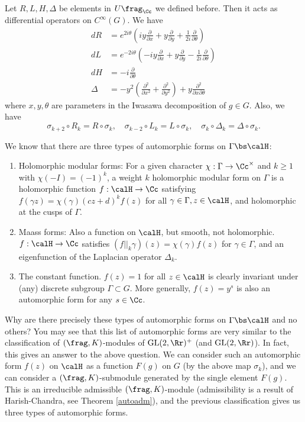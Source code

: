 \begin{proposition}
Let $R, L, H, \Delta$ be elements in $U\frag_{\Cc}$ we defined before. Then it acts as differential operators on $C^{\infty}(G)$. 
We have 
\begin{align*}
dR &= e^{2i\theta} \left( iy \frac{\partial}{\partial x} + y\frac{\partial}{\partial y} + \frac{1}{2i} \frac{\partial}{\partial \theta}\right) \\
dL &= e^{-2i\theta} \left(-iy \frac{\partial}{\partial x} + y \frac{\partial}{\partial y} - \frac{1}{2i}\frac{\partial}{\partial \theta}\right) \\
dH & = -i\frac{\partial}{\partial\theta} \\
\Delta &= -y^{2}\left( \frac{\partial^{2}}{\partial x^{2}} + \frac{\partial^{2}}{\partial y^{2}}\right) + y\frac{\partial^{2}}{\partial x \partial \theta} 
\end{align*} 
where $x, y, \theta$ are parameters in the Iwasawa decomposition of $g\in G$. 
Also, we have
$$
\sigma_{k+2} \circ R_k = R\circ \sigma_k, \quad \sigma_{k-2} \circ L_k = L \circ \sigma_k, \quad \sigma_k \circ \Delta_k = \Delta \circ \sigma_k. 
$$
\end{proposition}

We know that there are three types of automorphic forms on $\Gamma \bs \calH$:
\begin{enumerate}
\item Holomorphic modular forms: For a given character $\chi:\Gamma \to \Cc^{\times}$ and $k\geq 1$ with $\chi(-I) = (-1)^{k}$, a weight $k$ holomorphic modular form on $\Gamma$ is a holomorphic function $f:\calH \to \Cc$ satisfying $f(\gamma z) = \chi(\gamma)(cz+d)^{k}f(z)$ for all $\gamma\in \Gamma, z\in \calH$, and holomorphic at the cusps of $\Gamma$. 
\item Maass forms: Also a function on $\calH$, but smooth, not holomorphic. $f:\calH \to \Cc$ satisfies $(f||_{k}\gamma)(z) = \chi(\gamma)f(z)$ for $\gamma\in \Gamma$, and an eigenfunction of the Laplacian operator $\Delta_k$. 
\item The constant function. $f(z) = 1$ for all $z\in \calH$ is clearly invariant under (any) discrete subgroup $\Gamma \subset G$. 
More generally, $f(z) = y^{s}$ is also  an automorphic form for any $s\in \Cc$.
\end{enumerate}
Why are there precisely these types of automorphic forms on $\Gamma \bs \calH$ and no others? 
You may see that this list of automorphic forms are very similar to the classification of $(\frag, K)$-modules of $\GL(2, \Rr)^{+}$ (and $\GL(2, \Rr)$). 
In fact, this gives an answer to the above question. 
We can consider such an automorphic form $f(z)$ on $\calH$ as  a function $F(g)$ on $G$ (by the above map $\sigma_k$), and we can consider a $(\frag, K)$-submodule generated by the single element $F(g)$. 
This is an irreducible admissible $(\frag, K)$-module (admissibility is a result of Harish-Chandra, see Theorem \ref{autoadm}), and the previous classification gives us three types of automorphic forms. 

